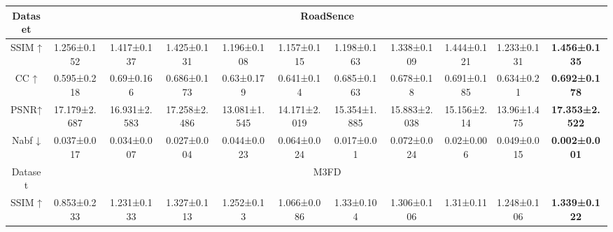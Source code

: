 \documentclass[journal]{IEEEtran}
\begin{document}
\begin{table*}[]
{\begin{tabular}{ccccccccccc}
Dataset            & \multicolumn{10}{c}{RoadSence}                                                                                                                                                                                                                                                                                                         \\ \hline
SSIM ↑             & 1.256±0.152                         & 1.417±0.137                        & {\color[HTML]{00B0F0} 1.425±0.131}  & 1.196±0.108                         & 1.157±0.115  & 1.198±0.163                        & 1.338±0.109                        & {\color[HTML]{FF0000} 1.444±0.121} & 1.233±0.131 & \textbf{1.456±0.135}                \\
CC    ↑            & 0.595±0.218                         & 0.69±0.166                         & {\color[HTML]{00B0F0} 0.686±0.173}  & 0.63±0.179                          & 0.641±0.14   & 0.685±0.163                        & 0.678±0.18                         & {\color[HTML]{FF0000} 0.691±0.185} & 0.634±0.21  & \textbf{0.692±0.178}                \\
PSNR↑              & {\color[HTML]{00B0F0} 17.179±2.687} & 16.931±2.583                       & {\color[HTML]{FF0000} 17.258±2.486} & 13.081±1.545                        & 14.171±2.019 & 15.354±1.885                       & 15.883±2.038                       & 15.156±2.14                        & 13.96±1.475 & \textbf{17.353±2.522}               \\
Nabf ↓             & 0.037±0.017                         & 0.034±0.007                        & 0.027±0.004                         & 0.044±0.023                         & 0.064±0.024  & {\color[HTML]{FF0000} 0.017±0.01}  & 0.072±0.024                        & {\color[HTML]{00B0F0} 0.02±0.006}  & 0.049±0.015 & \textbf{0.002±0.001}                \\ \hline
Dataset            & \multicolumn{10}{c}{M3FD}                                                                                                                                                                                                                                                                                                              \\ \hline
SSIM ↑             & 0.853±0.233                         & 1.231±0.133                        & {\color[HTML]{00B0F0} 1.327±0.113}  & 1.252±0.13                          & 1.066±0.086  & {\color[HTML]{FF0000} 1.33±0.104}  & 1.306±0.106                        & 1.31±0.11                          & 1.248±0.106 & \textbf{1.339±0.122}                \\

\end{tabular}}
\end{table*}
\end{document}
